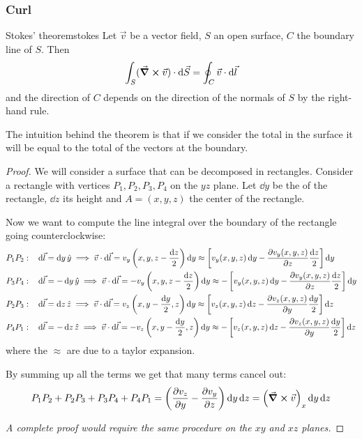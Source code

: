 \documentclass[12pt]{extarticle}
\begin{document}
\subsubsection{Curl}

\begin{theorem}{Stokes' theorem}{stokes}
	Let $\vec v$ be a vector field, $S$ an open surface, $C$ the boundary line of $S$.
	Then
	\begin{equation}
		\int_S (\curl \vec v) \cdot \dd{\vec S} = \oint_C \vec v \cdot \dd{\vec l}
	\end{equation}
	and the direction of $C$ depends on the direction of the normals of $S$ by the right-hand rule.
\end{theorem}

The intuition behind the theorem is that if we consider the total  in the surface it will be equal to the total  of the vectors at the boundary.

\begin{proof}
	We will consider a surface that can be decomposed in rectangles.
	Consider a rectangle with vertices $P_1,P_2,P_3,P_4$ on the $yz$ plane. Let $\dd{y}$ be the  of the rectangle, $\dd{z}$ its height and $A = (x, y, z)$ the center of the rectangle.

	Now we want to compute the line integral over the boundary of the rectangle going counterclockwise:
	\begin{align}
		P_1 P_2: \quad & \dd{\vec l} = \dd{y} \hat y \implies \vec v \cdot \dd{\vec l} = v_y\left(x, y, z - \frac{\dd{z}}{2}\right)\dd{y} \approx \left[v_y(x, y, z) \dd{y} - \pdv{v_y(x, y, z)}{z} \frac{\dd{z}}{2}\right] \dd{y}    \\
		P_3 P_4: \quad & \dd{\vec l} = -\dd{y} \hat y \implies \vec v \cdot \dd{\vec l} = -v_y\left(x, y, z - \frac{\dd{z}}{2}\right)\dd{y} \approx -\left[v_y(x, y, z) \dd{y} - \pdv{v_y(x, y, z)}{z} \frac{\dd{z}}{2}\right] \dd{y} \\
		P_2 P_3: \quad & \dd{\vec l} = \dd{z} \hat z \implies \vec v \cdot \dd{\vec l} = v_z\left(x, y - \frac{\dd{y}}{2}, z\right)\dd{y} \approx \left[v_z(x, y, z) \dd{z} - \pdv{v_z(x, y, z)}{y} \frac{\dd{y}}{2}\right] \dd{z}    \\
		P_4 P_1: \quad & \dd{\vec l} = -\dd{z} \hat z \implies \vec v \cdot \dd{\vec l} = -v_z\left(x, y - \frac{\dd{y}}{2}, z\right)\dd{y} \approx -\left[v_z(x, y, z) \dd{z} - \pdv{v_z(x, y, z)}{y} \frac{\dd{y}}{2}\right] \dd{z}
	\end{align}
	where the $\approx$ are due to a taylor expansion.

	By summing up all the terms we get that many terms cancel out:
	\begin{equation}
		P_1P_2 + P_2P_3 + P_3P_4 + P_4P_1 = \left( \pdv{v_z}{y} - \pdv{v_y}{z} \right) \dd{y} \dd{z} = \left( \curl \vec v \right)_x \dd{y} \dd{z}
	\end{equation}

	\textit{A complete proof would require the same procedure on the $xy$ and $xz$ planes.}
\end{proof}
\end{document}
